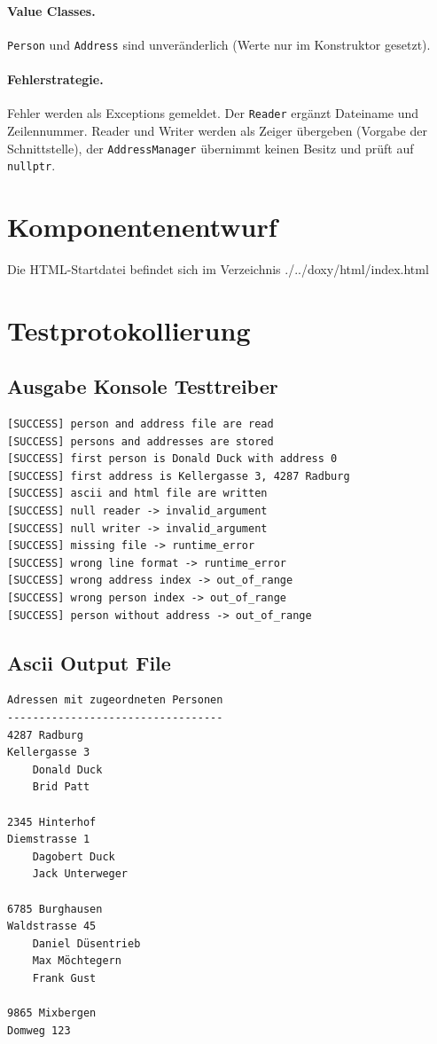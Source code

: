 \documentclass[a4paper,12pt]{article}
\begin{document}
\paragraph{Value Classes.} \texttt{Person} und \texttt{Address} sind unveränderlich
(Werte nur im Konstruktor gesetzt).

\paragraph{Fehlerstrategie.} Fehler werden als Exceptions gemeldet. Der \texttt{Reader}
ergänzt Dateiname und Zeilennummer. Reader und Writer werden als Zeiger übergeben
(Vorgabe der Schnittstelle), der \texttt{AddressManager} übernimmt keinen Besitz und
prüft auf \texttt{nullptr}.

\section{Komponentenentwurf}
Die HTML-Startdatei befindet sich im Verzeichnis ./../doxy/html/index.html
\section{Testprotokollierung}
\subsection{Ausgabe Konsole Testtreiber}
\begin{lstlisting}[style=textstyle]
[SUCCESS] person and address file are read
[SUCCESS] persons and addresses are stored
[SUCCESS] first person is Donald Duck with address 0
[SUCCESS] first address is Kellergasse 3, 4287 Radburg
[SUCCESS] ascii and html file are written
[SUCCESS] null reader -> invalid_argument
[SUCCESS] null writer -> invalid_argument
[SUCCESS] missing file -> runtime_error
[SUCCESS] wrong line format -> runtime_error
[SUCCESS] wrong address index -> out_of_range
[SUCCESS] wrong person index -> out_of_range
[SUCCESS] person without address -> out_of_range
\end{lstlisting}

\newpage
\subsection{Ascii Output File}
\begin{lstlisting}[style=textstyle]
Adressen mit zugeordneten Personen
----------------------------------
4287 Radburg
Kellergasse 3
    Donald Duck
    Brid Patt

2345 Hinterhof
Diemstrasse 1
    Dagobert Duck
    Jack Unterweger

6785 Burghausen
Waldstrasse 45
    Daniel Düsentrieb
    Max Möchtegern
    Frank Gust

9865 Mixbergen
Domweg 123


\end{lstlisting}
\newpage
\end{document}
